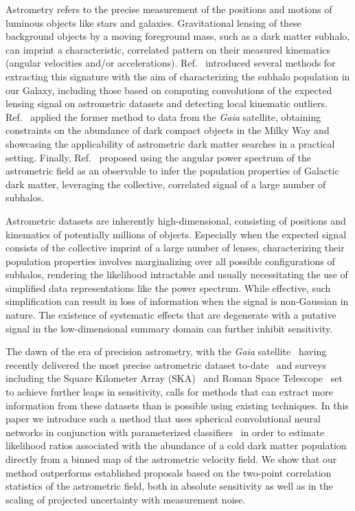 \documentclass[preprint]{article}
\begin{document}
Astrometry refers to the precise measurement of the positions and motions of luminous objects like stars and galaxies. Gravitational lensing of these background objects by a moving foreground mass, such as a dark matter subhalo, can imprint a characteristic, correlated pattern on their measured kinematics (angular velocities and/or accelerations). Ref.~\cite{VanTilburg:2018ykj} introduced several methods for extracting this signature with the aim of characterizing the subhalo population in our Galaxy, including those based on computing convolutions of the expected lensing signal on astrometric datasets and detecting local kinematic outliers. Ref.~\cite{Mondino:2020rkn} applied the former method to data from the \emph{Gaia} satellite, obtaining constraints on the abundance of dark compact objects in the Milky Way and showcasing the applicability of astrometric dark matter searches in a practical setting. Finally, Ref.~\cite{Mishra-Sharma:2020ynk} proposed using the angular power spectrum of the astrometric field as an observable to infer the population properties of Galactic dark matter, leveraging the collective, correlated signal of a large number of subhalos. 

Astrometric datasets are inherently high-dimensional, consisting of positions and kinematics of potentially millions of objects. Especially when the expected signal consists of the collective imprint of a large number of lenses, characterizing their population properties involves marginalizing over all possible configurations of subhalos, rendering the likelihood intractable and usually necessitating the use of simplified data representations like the power spectrum. While effective, such simplification can result in loss of information when the signal is non-Gaussian in nature. The existence of systematic effects that are degenerate with a putative signal in the low-dimensional summary domain can further inhibit sensitivity. 

The dawn of the era of precision astrometry, with the \emph{Gaia} satellite~\cite{2016A&A...595A...1G} having recently delivered the most precise astrometric dataset to-date~\cite{2018A&A...616A...1G,2018A&A...616A...2L,2021A&A...649A...1G} and surveys including the Square Kilometer Array (SKA)~\cite{Fomalont:2004hr,Jarvis:2015tqa} and Roman Space Telescope~\cite{2019JATIS...5d4005W} set to achieve further leaps in sensitivity, calls for methods that can extract more information from these datasets than is possible using existing techniques. In this paper we introduce such a method that uses spherical convolutional neural networks in conjunction with parameterized classifiers~\cite{Cranmer:2015bka,Baldi:2016fzo} in order to estimate likelihood ratios associated with the abundance of a cold dark matter population directly from a binned map of the astrometric velocity field. 
We show that our method outperforms established proposals based on the two-point correlation statistics of the astrometric field, both in absolute sensitivity as well as in the scaling of projected uncertainty with measurement noise.
\end{document}
